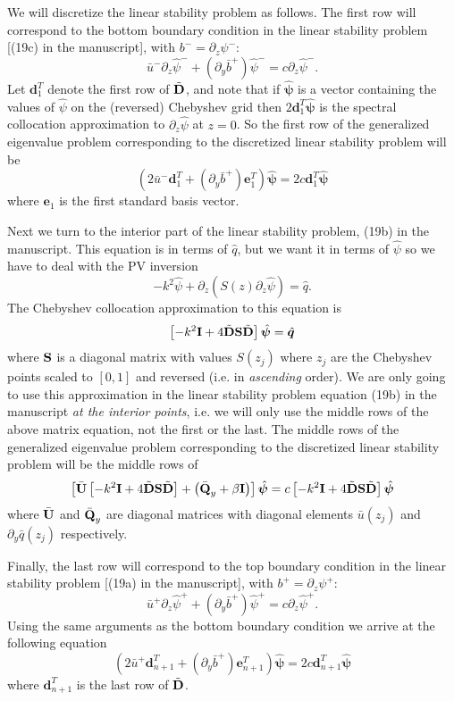 \documentclass[10pt]{article}
\newcommand{\pd}[1]{\partial_{#1}}
\newcommand{\mat}[1]{\text{\bf #1}}
\begin{document}
We will discretize the linear stability problem as follows.
The first row will correspond to the bottom boundary condition in the linear stability problem [(19c) in the manuscript], with $b^-=\pd{z}\psi^-$: 
\[\bar{u}^-\pd{z}\hat{\psi}^-+(\pd{y}\bar{b}^+)\hat{\psi}^- = c\pd{z}\hat{\psi}^-.\]
Let $\bm{d}_1^T$ denote the first row of $\tilde{\mat{D}}$, and note that if $\hat{\bm{\psi}}$ is a vector containing the values of $\hat{\psi}$ on the (reversed) Chebyshev grid then $2\bm{d}_1^T\hat{\bm{\psi}}$ is the spectral collocation approximation to $\pd{z}\hat{\psi}$ at $z=0$.
So the first row of the generalized eigenvalue problem corresponding to the discretized linear stability problem will be
\[(2\bar{u}^-\bm{d}_1^T+(\pd{y}\bar{b}^+)\bm{e}_1^T)\hat{\bm{\psi}} = 2c\bm{d}_1^T\hat{\bm{\psi}}\]
where $\bm{e}_1$ is the first standard basis vector.

Next we turn to the interior part of the linear stability problem, (19b) in the manuscript.
This equation is in terms of $\hat{q}$, but we want it in terms of $\hat{\psi}$ so we have to deal with the PV inversion
\[-k^2\hat{\psi} + \pd{z}\left(S(z)\pd{z}\hat{\psi}\right) = \hat{q}.\]
The Chebyshev collocation approximation to this equation is
\[\left[-k^2\mat{I}+4\tilde{\mat{D}}\mat{S}\tilde{\mat{D}}\right]\hat{\bm{\psi}} = \hat{\bm{q}}\]
where $\mat{S}$ is a diagonal matrix with values $S(z_j)$ where $z_j$ are the Chebyshev points scaled to $[0,1]$ and reversed (i.e. in {\it ascending} order).
We are only going to use this approximation in the linear stability problem equation (19b) in the manuscript {\it at the interior points}, i.e. we will only use the middle rows of the above matrix equation, not the first or the last.
The middle rows of the generalized eigenvalue problem corresponding to the discretized linear stability problem will be the middle rows of 
\[\left[\bar{\mat{U}}\left[-k^2\mat{I}+4\tilde{\mat{D}}\mat{S}\tilde{\mat{D}}\right] +\left(\bar{\mat{Q}}_y+\beta\mat{I}\right)\right]\hat{\bm{\psi}} = c\left[-k^2\mat{I}+4\tilde{\mat{D}}\mat{S}\tilde{\mat{D}}\right]\hat{\bm{\psi}}\]
where $\bar{\mat{U}}$ and $\bar{\mat{Q}}_y$ are diagonal matrices with diagonal elements $\bar{u}(z_j)$ and $\pd{y}\bar{q}(z_j)$ respectively.

Finally, the last row will correspond to the top boundary condition in the linear stability problem [(19a) in the manuscript], with $b^+=\pd{z}\psi^+$: 
\[\bar{u}^+\pd{z}\hat{\psi}^++(\pd{y}\bar{b}^+)\hat{\psi}^+ = c\pd{z}\hat{\psi}^+.\]
Using the same arguments as the bottom boundary condition we arrive at the following equation
\[(2\bar{u}^+\bm{d}_{n+1}^T+(\pd{y}\bar{b}^+)\bm{e}_{n+1}^T)\hat{\bm{\psi}} = 2c\bm{d}_{n+1}^T\hat{\bm{\psi}}\]
where $\bm{d}_{n+1}^T$ is the last row of $\tilde{\mat{D}}$.
\end{document}
